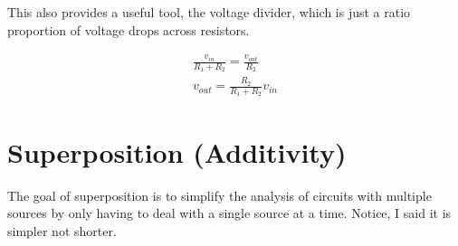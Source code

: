 \documentclass{handout}
\begin{document}

This also provides a useful tool, the voltage divider, which is just a ratio proportion of voltage drops across resistors.

\begin{eqnarray}
	\frac{v_{in}}{R_1 + R_2} = \frac{v_{out}}{R_2} \\
	v_{out} = \frac{R_2}{R_1 + R_2} v_{in}
\end{eqnarray}

\newpage
\clearpage
\pagebreak

\section{Superposition (Additivity)}
The goal of superposition is to simplify the analysis of circuits with multiple sources by only having to deal with a single source at a time.  Notice, I said it is simpler not shorter.

\end{document}
